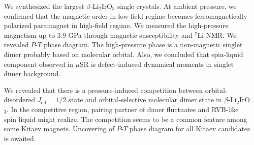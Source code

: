 We synthesized the largest $\beta$-Li$_2$IrO$_3$ single crystals.
At ambient pressure, we confirmed that the magnetic order in low-field regime becomes ferromagnetically polarized paramagnet in high-field regime.
We measured the high-pressure magnetism up to 3.9 GPa through magnetic susceptibility and ${}^7$Li NMR.
We revealed $P$-$T$ phase diagram.
The high-pressure phase is a non-magnetic singlet dimer probably based on molecular orbital.
Also, we concluded that spin-liquid component observed in $\mu$SR is defect-induced dynamical moments in singlet dimer background.

We revealed that there is a pressure-induced competition between orbital-disordered $J_{\mathrm{eff}} = 1/2$ state and orbital-selective molecular dimer state in $\beta$-Li$_2$IrO$_3$.
In the competitive region, pairing partner of dimer fluctuates and RVB-like spin liquid might realize.
The competition seems to be a common feature among some Kitaev magnets.
Uncovering of $P$-$T$ phase diagram for all Kitaev candidates is awaited.
